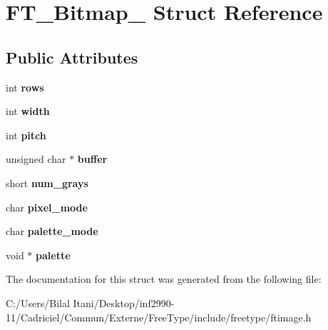 \hypertarget{struct_f_t___bitmap__}{}\section{F\+T\+\_\+\+Bitmap\+\_\+ Struct Reference}
\label{struct_f_t___bitmap__}
\subsection*{Public Attributes}
\begin{DoxyCompactItemize}
\item 
int {\bfseries rows}\hypertarget{struct_f_t___bitmap___a1b6bb20b30fe087e3fc87a0eb37730c0}{}\label{struct_f_t___bitmap___a1b6bb20b30fe087e3fc87a0eb37730c0}

\item 
int {\bfseries width}\hypertarget{struct_f_t___bitmap___a7b5e6252dd91a3809fe80ebbeb6720eb}{}\label{struct_f_t___bitmap___a7b5e6252dd91a3809fe80ebbeb6720eb}

\item 
int {\bfseries pitch}\hypertarget{struct_f_t___bitmap___afdee595846e1188c7a76d0cec9d85cf2}{}\label{struct_f_t___bitmap___afdee595846e1188c7a76d0cec9d85cf2}

\item 
unsigned char $\ast$ {\bfseries buffer}\hypertarget{struct_f_t___bitmap___a76439b1d3c13b81ca506108cd1623284}{}\label{struct_f_t___bitmap___a76439b1d3c13b81ca506108cd1623284}

\item 
short {\bfseries num\+\_\+grays}\hypertarget{struct_f_t___bitmap___a415d78060f8012d312703c9792ec005a}{}\label{struct_f_t___bitmap___a415d78060f8012d312703c9792ec005a}

\item 
char {\bfseries pixel\+\_\+mode}\hypertarget{struct_f_t___bitmap___a5cc5e0fe42a93a86e16706ad52e087a2}{}\label{struct_f_t___bitmap___a5cc5e0fe42a93a86e16706ad52e087a2}

\item 
char {\bfseries palette\+\_\+mode}\hypertarget{struct_f_t___bitmap___ae7c8c74255cd27873b12a360cd5f3884}{}\label{struct_f_t___bitmap___ae7c8c74255cd27873b12a360cd5f3884}

\item 
void $\ast$ {\bfseries palette}\hypertarget{struct_f_t___bitmap___a8d5ecf4409f71bfb559e0d13d8df4d86}{}\label{struct_f_t___bitmap___a8d5ecf4409f71bfb559e0d13d8df4d86}

\end{DoxyCompactItemize}


The documentation for this struct was generated from the following file\+:\begin{DoxyCompactItemize}
\item 
C\+:/\+Users/\+Bilal Itani/\+Desktop/inf2990-\/11/\+Cadriciel/\+Commun/\+Externe/\+Free\+Type/include/freetype/ftimage.\+h\end{DoxyCompactItemize}
